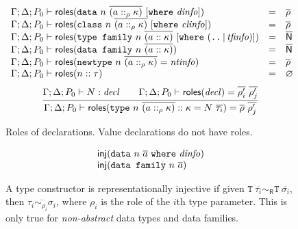 \begin{figure}
\[
\begin{array}{lcl}
\Gamma; \Delta; P_0 \vdash \textsf{roles}( \texttt{data}~n~\overline{(a ::_\rho \kappa)}~[\texttt{where}~\mathit{dinfo}] )&=&\overline{\rho} \\
\Gamma; \Delta; P_0 \vdash \textsf{roles}( \texttt{class}~n~\overline{(a ::_\rho \kappa)}~[\texttt{where}~\mathit{clinfo}] )&=&\overline{\rho} \\
\Gamma; \Delta; P_0 \vdash \textsf{roles}( \texttt{type family}~n~\overline{(a :: \kappa)}~[\texttt{where}~(\texttt{..} \,|\, \mathit{tfinfo})]  )&=&\overline{\textsf{N}} \\
\Gamma; \Delta; P_0 \vdash \textsf{roles}( \texttt{data family}~n~\overline{(a :: \kappa)}  )&=&\overline{\textsf{N}} \\
\Gamma; \Delta; P_0 \vdash \textsf{roles}( \texttt{newtype}~n~\overline{(a ::_\rho \kappa)} = \mathit{ntinfo} )&=&\overline{\rho} \\
\Gamma; \Delta; P_0 \vdash \textsf{roles}( n :: \tau )&=&\varnothing \\
\end{array}
\]
\[
\frac{
\Gamma; \Delta; P_0 \vdash N : \mathit{decl} \qquad
\Gamma; \Delta; P_0 \vdash \textsf{roles}(\mathit{decl}) = \overline{\rho'_i}~\overline{\rho'_j}
}{
\Gamma; \Delta; P_0 \vdash \textsf{roles}( \texttt{type}~n~\overline{(a ::_\rho \kappa)} :: \kappa = N~\overline{\tau_i} ) = \overline{\rho}~\overline{\rho'_j}
}
\]
\caption{Roles of declarations.  Value declarations do not have roles.}
\end{figure}

\begin{figure}
\[
\begin{array}{l}
\textsf{inj}( \texttt{data}~n~\overline{a}~\texttt{where}~\mathit{dinfo} ) \\
\textsf{inj}( \texttt{data family}~n~\overline{a} ) \\
\end{array}
\]
\caption{A type constructor is representationally injective if given $\texttt{T}~\overline{\tau_i} \sim_\textsf{R} \texttt{T}~\overline{\sigma_i}$, then $\overline{\tau_i \sim_{\rho_i} \sigma_i}$, where $\rho_i$ is the role of the $i$th type parameter.  This is only true for \emph{non-abstract} data types and data families.}
\label{fig:representational-injectivity}
\end{figure}
